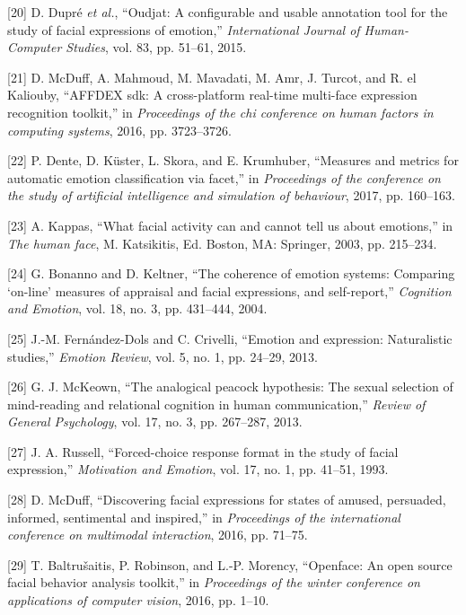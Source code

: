 \documentclass[conference,final,]{IEEEtran}
\begin{document}
\leavevmode\hypertarget{ref-dupre2015oudjat}{}%
{[}20{]} D. Dupré \emph{et al.}, ``Oudjat: A configurable and usable
annotation tool for the study of facial expressions of emotion,''
\emph{International Journal of Human-Computer Studies}, vol. 83, pp.
51--61, 2015.

\leavevmode\hypertarget{ref-mcduff2016affdex}{}%
{[}21{]} D. McDuff, A. Mahmoud, M. Mavadati, M. Amr, J. Turcot, and R.
el Kaliouby, ``AFFDEX sdk: A cross-platform real-time multi-face
expression recognition toolkit,'' in \emph{Proceedings of the chi
conference on human factors in computing systems}, 2016, pp. 3723--3726.

\leavevmode\hypertarget{ref-dente2017measures}{}%
{[}22{]} P. Dente, D. Küster, L. Skora, and E. Krumhuber, ``Measures and
metrics for automatic emotion classification via facet,'' in
\emph{Proceedings of the conference on the study of artificial
intelligence and simulation of behaviour}, 2017, pp. 160--163.

\leavevmode\hypertarget{ref-kappas2003facial}{}%
{[}23{]} A. Kappas, ``What facial activity can and cannot tell us about
emotions,'' in \emph{The human face}, M. Katsikitis, Ed. Boston, MA:
Springer, 2003, pp. 215--234.

\leavevmode\hypertarget{ref-bonanno2004brief}{}%
{[}24{]} G. Bonanno and D. Keltner, ``The coherence of emotion systems:
Comparing `on-line' measures of appraisal and facial expressions, and
self-report,'' \emph{Cognition and Emotion}, vol. 18, no. 3, pp.
431--444, 2004.

\leavevmode\hypertarget{ref-fernandez2013emotion}{}%
{[}25{]} J.-M. Fernández-Dols and C. Crivelli, ``Emotion and expression:
Naturalistic studies,'' \emph{Emotion Review}, vol. 5, no. 1, pp.
24--29, 2013.

\leavevmode\hypertarget{ref-mckeown2013analogical}{}%
{[}26{]} G. J. McKeown, ``The analogical peacock hypothesis: The sexual
selection of mind-reading and relational cognition in human
communication,'' \emph{Review of General Psychology}, vol. 17, no. 3,
pp. 267--287, 2013.

\leavevmode\hypertarget{ref-russell1993forced}{}%
{[}27{]} J. A. Russell, ``Forced-choice response format in the study of
facial expression,'' \emph{Motivation and Emotion}, vol. 17, no. 1, pp.
41--51, 1993.

\leavevmode\hypertarget{ref-mcduff2016discovering}{}%
{[}28{]} D. McDuff, ``Discovering facial expressions for states of
amused, persuaded, informed, sentimental and inspired,'' in
\emph{Proceedings of the international conference on multimodal
interaction}, 2016, pp. 71--75.

\leavevmode\hypertarget{ref-baltruvsaitis2016openface}{}%
{[}29{]} T. Baltrušaitis, P. Robinson, and L.-P. Morency, ``Openface: An
open source facial behavior analysis toolkit,'' in \emph{Proceedings of
the winter conference on applications of computer vision}, 2016, pp.
1--10.
\end{document}

